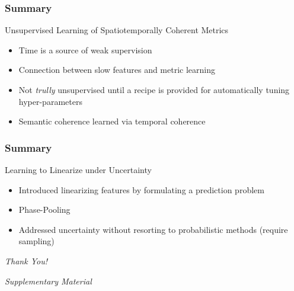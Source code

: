 \documentclass{beamer}
\begin{document}
\begin{frame}
\frametitle{Summary} 
\color{blue} Unsupervised Learning of Spatiotemporally Coherent Metrics
\begin{itemize} 
\item Time is a source of weak supervision 
\item Connection between slow features and metric learning 
\item Not \emph{trully} unsupervised until a recipe is provided for automatically tuning hyper-parameters 
\item Semantic coherence learned via temporal coherence 
\end{itemize} 
\end{frame} 

\begin{frame}
\frametitle{Summary} 
\color{blue} Learning to Linearize under Uncertainty
\begin{itemize} 
\item Introduced linearizing features by formulating a prediction problem 
\item Phase-Pooling
\item Addressed uncertainty without resorting to probabilistic methods (require sampling)
\end{itemize} 
\end{frame} 

\begin{frame}
\begin{center} 
\huge \color{blue} \emph{Thank You!}
\end{center} 
\end{frame}

\begin{frame}
\begin{center} 
\huge \color{blue} \emph{Supplementary Material}
\end{center} 
\end{frame}
\end{document}

